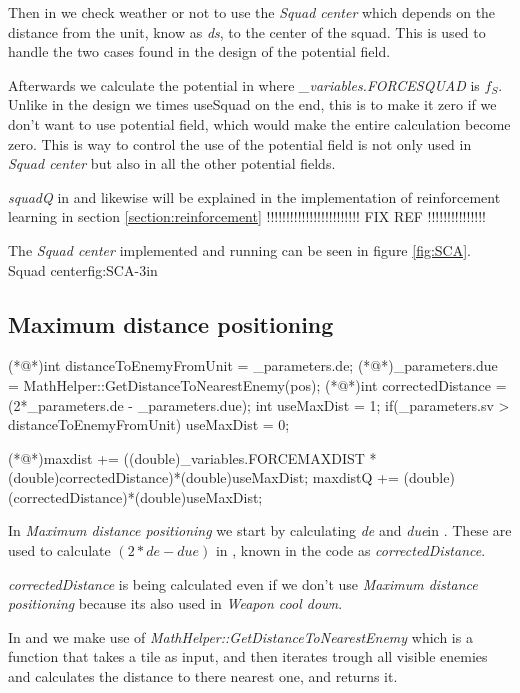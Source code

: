		Then in  we check weather or not to use the \textit{Squad center} which depends on the distance from the unit, know as \textit{ds}, to the center of the squad. This is used to handle the two cases found in the design of the potential field.
		
		Afterwards we calculate the potential in  where \textit{\_variables.FORCESQUAD} is $f_{S}$. Unlike in the design we times useSquad on the end, this is to make it zero if we don't want to use potential field, which would make the entire calculation become zero. This is way to control the use of the potential field is not only used in \textit{Squad center} but also in all the other potential fields.
		
		\textit{squadQ} in  and likewise will be explained in the implementation of reinforcement learning in section \ref{section:reinforcement} !!!!!!!!!!!!!!!!!!!!!!!! FIX REF !!!!!!!!!!!!!!!
		
		The \textit{Squad center} implemented and running can be seen in figure \ref{fig:SCA}.
			{Squad center}{fig:SCA}{-3in}
			
	\subsection{Maximum distance positioning}
		\begin{Sourcecode}[caption=Maximum distance]
(*@\lnote@*)int distanceToEnemyFromUnit = _parameters.de;
(*@\lnote@*)_parameters.due = MathHelper::GetDistanceToNearestEnemy(pos);
(*@\lnote@*)int correctedDistance = (2*_parameters.de - _parameters.due);
int useMaxDist = 1;
if(_parameters.sv > distanceToEnemyFromUnit)
	useMaxDist = 0;

(*@\lnote@*)maxdist += ((double)_variables.FORCEMAXDIST * (double)correctedDistance)*(double)useMaxDist;
maxdistQ += (double)(correctedDistance)*(double)useMaxDist;
\end{Sourcecode}
	
	In \textit{Maximum distance positioning} we start by calculating \textit{de} and \textit{due}in  . These are used to calculate $(2*de - due)$ in , known in the code as \textit{correctedDistance}. 
	
	\textit{correctedDistance} is being calculated even if we don't use \textit{Maximum distance positioning} because its also used in \textit{Weapon cool down}. 
	
	In  and  we make use of \textit{MathHelper::GetDistanceToNearestEnemy} which is a function that takes a tile as input, and then iterates trough all visible enemies and calculates the distance to there nearest one, and returns it.
	
